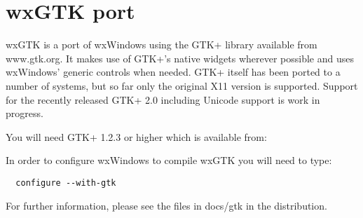 \section{wxGTK port}\label{wxgtkport}

wxGTK is a port of wxWindows using the GTK+ library available
from www.gtk.org. It makes use of GTK+'s native widgets wherever
possible and uses wxWindows' generic controls when needed. GTK+
itself has been ported to a number of systems, but so far only the
original X11 version is supported. Support for the recently released
GTK+ 2.0 including Unicode support is work in progress.

You will need GTK+ 1.2.3 or higher which is available from:


In order to configure wxWindows to compile wxGTK you will 
need to type:

\begin{verbatim}
  configure --with-gtk
\end{verbatim}

For further information, please see the files in docs/gtk
in the distribution.

